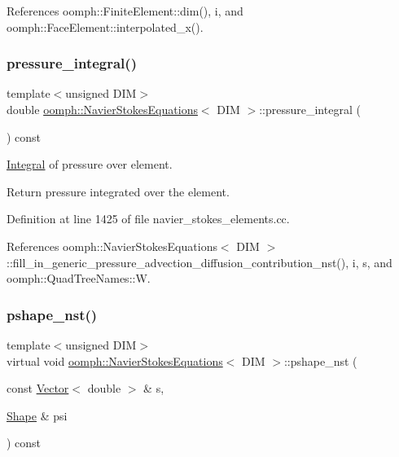 References oomph\+::\+Finite\+Element\+::dim(), i, and oomph\+::\+Face\+Element\+::interpolated\+\_\+x().

\mbox{\label{classoomph_1_1NavierStokesEquations_ad3305dc17d1cb9cec2771b88e4cdb4d2}} 
\subsubsection{\texorpdfstring{pressure\+\_\+integral()}{pressure\_integral()}}
{\footnotesize\ttfamily template$<$unsigned D\+IM$>$ \\
double \hyperlink{classoomph_1_1NavierStokesEquations}{oomph\+::\+Navier\+Stokes\+Equations}$<$ D\+IM $>$\+::pressure\+\_\+integral (\begin{DoxyParamCaption}{ }\end{DoxyParamCaption}) const}



\hyperlink{classoomph_1_1Integral}{Integral} of pressure over element. 

Return pressure integrated over the element. 

Definition at line 1425 of file navier\+\_\+stokes\+\_\+elements.\+cc.



References oomph\+::\+Navier\+Stokes\+Equations$<$ D\+I\+M $>$\+::fill\+\_\+in\+\_\+generic\+\_\+pressure\+\_\+advection\+\_\+diffusion\+\_\+contribution\+\_\+nst(), i, s, and oomph\+::\+Quad\+Tree\+Names\+::W.

\mbox{\label{classoomph_1_1NavierStokesEquations_a487030303b71da299aed3d4639a022ab}} 
\subsubsection{\texorpdfstring{pshape\+\_\+nst()}{pshape\_nst()}\hspace{0.1cm}{\footnotesize\ttfamily [1/2]}}
{\footnotesize\ttfamily template$<$unsigned D\+IM$>$ \\
virtual void \hyperlink{classoomph_1_1NavierStokesEquations}{oomph\+::\+Navier\+Stokes\+Equations}$<$ D\+IM $>$\+::pshape\+\_\+nst (\begin{DoxyParamCaption}\item[{const \hyperlink{classoomph_1_1Vector}{Vector}$<$ double $>$ \&}]{s,  }\item[{\hyperlink{classoomph_1_1Shape}{Shape} \&}]{psi }\end{DoxyParamCaption}) const\hspace{0.3cm}{\ttfamily [pure virtual]}}



